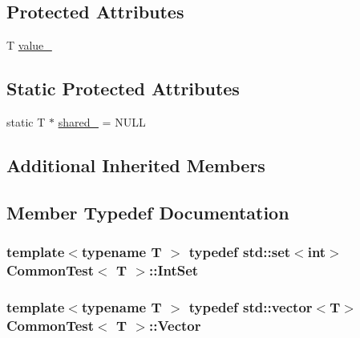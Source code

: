 \subsection*{Protected Attributes}
\begin{DoxyCompactItemize}
\item 
T \hyperlink{class_common_test_ae59c4abcb833625a7baeb2048531ebec}{value\+\_\+}
\end{DoxyCompactItemize}
\subsection*{Static Protected Attributes}
\begin{DoxyCompactItemize}
\item 
static T $\ast$ \hyperlink{class_common_test_a52368ce1e65a865db9bdccbcc2cedaac}{shared\+\_\+} = N\+U\+L\+L
\end{DoxyCompactItemize}
\subsection*{Additional Inherited Members}


\subsection{Member Typedef Documentation}
\hypertarget{class_common_test_a62827e9d3064cddf4a8698747f1bd434}{}
\subsubsection[{Int\+Set}]{\setlength{\rightskip}{0pt plus 5cm}template$<$typename T $>$ typedef std\+::set$<$int$>$ {\bf Common\+Test}$<$ T $>$\+::{\bf Int\+Set}\hspace{0.3cm}{\ttfamily [protected]}}\label{class_common_test_a62827e9d3064cddf4a8698747f1bd434}
\hypertarget{class_common_test_a6dfdcede6964887b9f4254a0e0478e37}{}
\subsubsection[{Vector}]{\setlength{\rightskip}{0pt plus 5cm}template$<$typename T $>$ typedef std\+::vector$<$T$>$ {\bf Common\+Test}$<$ T $>$\+::{\bf Vector}\hspace{0.3cm}{\ttfamily [protected]}}\label{class_common_test_a6dfdcede6964887b9f4254a0e0478e37}


